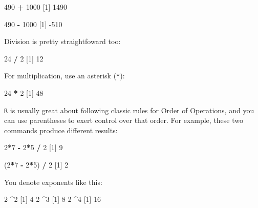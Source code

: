 \documentclass[
]{book}
\newenvironment{Shaded}{\begin{snugshade}}{\end{snugshade}}
\newcommand{\DecValTok}[1]{\textcolor[rgb]{0.00,0.00,0.81}{#1}}
\newcommand{\NormalTok}[1]{#1}
\newcommand{\OperatorTok}[1]{\textcolor[rgb]{0.81,0.36,0.00}{\textbf{#1}}}
\newcommand{\StringTok}[1]{\textcolor[rgb]{0.31,0.60,0.02}{#1}}
\begin{document}
\begin{Shaded}
\begin{Highlighting}[]
\DecValTok{490} \OperatorTok{+}\StringTok{ }\DecValTok{1000}
\NormalTok{[}\DecValTok{1}\NormalTok{] }\DecValTok{1490}

\DecValTok{490} \OperatorTok{-}\StringTok{ }\DecValTok{1000}
\NormalTok{[}\DecValTok{1}\NormalTok{] }\DecValTok{-510}
\end{Highlighting}
\end{Shaded}

Division is pretty straightfoward too:

\begin{Shaded}
\begin{Highlighting}[]
\DecValTok{24} \OperatorTok{/}\StringTok{ }\DecValTok{2}
\NormalTok{[}\DecValTok{1}\NormalTok{] }\DecValTok{12}
\end{Highlighting}
\end{Shaded}

For multiplication, use an asterisk (\texttt{*}):

\begin{Shaded}
\begin{Highlighting}[]
\DecValTok{24} \OperatorTok{*}\StringTok{ }\DecValTok{2}
\NormalTok{[}\DecValTok{1}\NormalTok{] }\DecValTok{48}
\end{Highlighting}
\end{Shaded}

\texttt{R} is usually great about following classic rules for Order of Operations, and you can use parentheses to exert control over that order. For example, these two commands produce different results:

\begin{Shaded}
\begin{Highlighting}[]
\DecValTok{2}\OperatorTok{*}\DecValTok{7} \OperatorTok{-}\StringTok{ }\DecValTok{2}\OperatorTok{*}\DecValTok{5} \OperatorTok{/}\StringTok{ }\DecValTok{2}
\NormalTok{[}\DecValTok{1}\NormalTok{] }\DecValTok{9}

\NormalTok{(}\DecValTok{2}\OperatorTok{*}\DecValTok{7} \OperatorTok{-}\StringTok{ }\DecValTok{2}\OperatorTok{*}\DecValTok{5}\NormalTok{) }\OperatorTok{/}\StringTok{ }\DecValTok{2}
\NormalTok{[}\DecValTok{1}\NormalTok{] }\DecValTok{2}
\end{Highlighting}
\end{Shaded}

You denote exponents like this:

\begin{Shaded}
\begin{Highlighting}[]
\DecValTok{2} \OperatorTok{^}\DecValTok{2}
\NormalTok{[}\DecValTok{1}\NormalTok{] }\DecValTok{4}
\DecValTok{2} \OperatorTok{^}\DecValTok{3}
\NormalTok{[}\DecValTok{1}\NormalTok{] }\DecValTok{8}
\DecValTok{2} \OperatorTok{^}\DecValTok{4}
\NormalTok{[}\DecValTok{1}\NormalTok{] }\DecValTok{16}
\end{Highlighting}
\end{Shaded}
\end{document}
